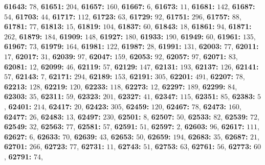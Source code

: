 \textsf{\bfseries 61643:} $78$, \textsf{\bfseries 61651:} $204$, \textsf{\bfseries 61657:} $160$, \textsf{\bfseries 61667:} $6$, \textsf{\bfseries 61673:} $11$, \textsf{\bfseries 61681:} $142$, \textsf{\bfseries 61687:} $54$, \textsf{\bfseries 61703:} $44$, \textsf{\bfseries 61717:} $112$, \textsf{\bfseries 61723:} $63$, \textsf{\bfseries 61729:} $92$, \textsf{\bfseries 61751:} $296$, \textsf{\bfseries 61757:} $88$, \textsf{\bfseries 61781:} $77$, \textsf{\bfseries 61813:} $15$, \textsf{\bfseries 61819:} $104$, \textsf{\bfseries 61837:} $60$, \textsf{\bfseries 61843:} $18$, \textsf{\bfseries 61861:} $94$, \textsf{\bfseries 61871:} $262$, \textsf{\bfseries 61879:} $184$, \textsf{\bfseries 61909:} $148$, \textsf{\bfseries 61927:} $180$, \textsf{\bfseries 61933:} $190$, \textsf{\bfseries 61949:} $60$, \textsf{\bfseries 61961:} $135$, \textsf{\bfseries 61967:} $73$, \textsf{\bfseries 61979:} $164$, \textsf{\bfseries 61981:} $122$, \textsf{\bfseries 61987:} $28$, \textsf{\bfseries 61991:} $131$, \textsf{\bfseries 62003:} $77$, \textsf{\bfseries 62011:} $17$, \textsf{\bfseries 62017:} $31$, \textsf{\bfseries 62039:} $97$, \textsf{\bfseries 62047:} $159$, \textsf{\bfseries 62053:} $92$, \textsf{\bfseries 62057:} $97$, \textsf{\bfseries 62071:} $83$, \textsf{\bfseries 62081:} $12$, \textsf{\bfseries 62099:} $46$, \textsf{\bfseries 62119:} $57$, \textsf{\bfseries 62129:} $147$, \textsf{\bfseries 62131:} $193$, \textsf{\bfseries 62137:} $126$, \textsf{\bfseries 62141:} $57$, \textsf{\bfseries 62143:} $7$, \textsf{\bfseries 62171:} $294$, \textsf{\bfseries 62189:} $153$, \textsf{\bfseries 62191:} $305$, \textsf{\bfseries 62201:} $491$, \textsf{\bfseries 62207:} $78$, \textsf{\bfseries 62213:} $128$, \textsf{\bfseries 62219:} $120$, \textsf{\bfseries 62233:} $118$, \textsf{\bfseries 62273:} $12$, \textsf{\bfseries 62297:} $189$, \textsf{\bfseries 62299:} $84$, \textsf{\bfseries 62303:} $35$, \textsf{\bfseries 62311:} $59$, \textsf{\bfseries 62323:} $201$, \textsf{\bfseries 62327:} $41$, \textsf{\bfseries 62347:} $115$, \textsf{\bfseries 62351:} $85$, \textsf{\bfseries 62383:} $5$, \textsf{\bfseries 62401:} $214$, \textsf{\bfseries 62417:} $20$, \textsf{\bfseries 62423:} $305$, \textsf{\bfseries 62459:} $120$, \textsf{\bfseries 62467:} $78$, \textsf{\bfseries 62473:} $160$, \textsf{\bfseries 62477:} $26$, \textsf{\bfseries 62483:} $13$, \textsf{\bfseries 62497:} $230$, \textsf{\bfseries 62501:} $8$, \textsf{\bfseries 62507:} $50$, \textsf{\bfseries 62533:} $82$, \textsf{\bfseries 62539:} $72$, \textsf{\bfseries 62549:} $32$, \textsf{\bfseries 62563:} $77$, \textsf{\bfseries 62581:} $57$, \textsf{\bfseries 62591:} $51$, \textsf{\bfseries 62597:} $2$, \textsf{\bfseries 62603:} $96$, \textsf{\bfseries 62617:} $111$, \textsf{\bfseries 62627:} $6$, \textsf{\bfseries 62633:} $70$, \textsf{\bfseries 62639:} $43$, \textsf{\bfseries 62653:} $50$, \textsf{\bfseries 62659:} $194$, \textsf{\bfseries 62683:} $35$, \textsf{\bfseries 62687:} $21$, \textsf{\bfseries 62701:} $266$, \textsf{\bfseries 62723:} $77$, \textsf{\bfseries 62731:} $11$, \textsf{\bfseries 62743:} $51$, \textsf{\bfseries 62753:} $63$, \textsf{\bfseries 62761:} $56$, \textsf{\bfseries 62773:} $60$, \textsf{\bfseries 62791:} $74$, 

